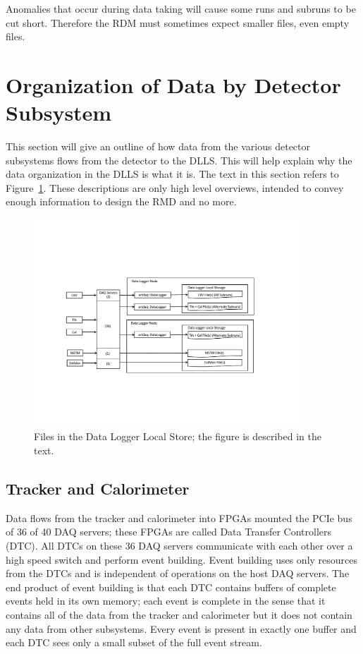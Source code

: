 Anomalies that occur during data taking will cause some runs
and subruns to be cut short.  Therefore the RDM must sometimes
expect smaller files, even empty files.


\section{Organization of Data by Detector Subsystem }
\label{ssec:dataOrganization}

This section will give an outline of how data from the
various detector subsystems flows from the detector to the DLLS.
This will help explain why the data organization in the DLLS is what it is.
The text in this section refers to Figure~\ref{fig:filesDLLS}.
These descriptions are only high level overviews,
intended to convey enough information to design the RMD and no more.


\begin{figure}[tbp]
\centering
\includegraphics[width=0.9\textwidth]{figures/FilesInDLLS.pdf}
\caption[Files in the DLLS]{
  Files in the Data Logger Local Store; the figure is described in the text.}
\label{fig:filesDLLS}
\end{figure}


\subsection{Tracker and Calorimeter}
\label{ssec:TrkAndCal}

Data flows from the tracker and calorimeter into FPGAs mounted the PCIe bus of 36 of 40 DAQ servers;
these FPGAs are called Data Transfer Controllers (DTC).
All DTCs on these 36 DAQ servers communicate with each other over a high speed switch
and perform event building.
Event building uses only resources from the DTCs and is independent of operations on the host DAQ servers.
The end product of event building is that each DTC contains buffers of complete events held in its own memory;
each event is complete in the sense that it contains all of the data from the tracker and calorimeter
but it does not contain any data from other subsystems.
Every event is present in exactly one buffer and each DTC sees only a small subset of the full event stream.

